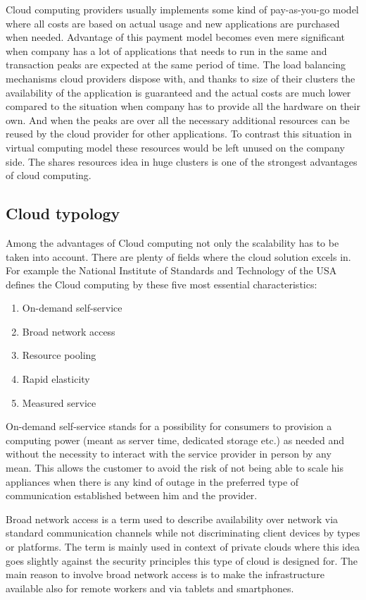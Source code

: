Cloud computing providers usually implements some kind of pay-as-you-go model where all costs are based on actual usage and new applications are purchased when needed. Advantage of this payment model becomes even mere significant when company has a lot of applications that needs to run in the same and transaction peaks are expected at the same period of time. The load balancing mechanisms cloud providers dispose with, and thanks to size of their clusters the availability of the application is guaranteed  and the actual costs are much lower compared to the situation when company has to provide all the hardware on their own. And when the peaks are over all the necessary additional resources can be reused by the cloud provider for other applications. To contrast this situation in virtual computing model these resources would be left unused on the company side. The shares resources idea in huge clusters is one of the strongest advantages of cloud computing.

\subsection{Cloud typology}
\label{sub:Cloud typology}

Among the advantages of Cloud computing not only the scalability has to be taken into account. There are plenty of fields where the cloud solution excels in. For example the National Institute of Standards and Technology of the USA defines the Cloud computing by these five most essential characteristics:

\begin{enumerate}
	\item On-demand self-service
	\item Broad network access
	\item Resource pooling
	\item Rapid elasticity
	\item Measured service
\end{enumerate}

On-demand self-service stands for a possibility for consumers to provision a computing power (meant as server time, dedicated storage etc.) as needed and without the necessity to interact with the service provider in person by any mean. This allows the customer to avoid the risk of not being able to scale his appliances when there is any kind of outage in the preferred type of communication established between him and the provider.

Broad network access is a term used to describe availability over network via standard communication channels while not discriminating client devices by types or platforms. The term is mainly used in context of private clouds where this idea goes slightly against the security principles this type of cloud is designed for. The main reason to involve broad network access is to make the infrastructure available also for remote workers and via tablets and smartphones.

